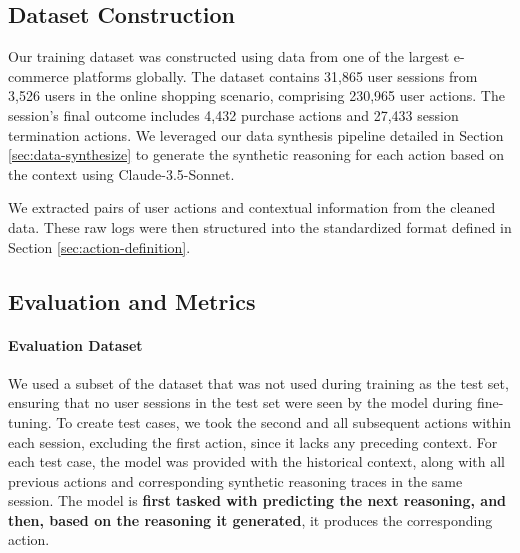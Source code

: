 \documentclass[11pt]{article}
\newcommand{\jing}[1]{\textcolor{purple}{{[Jing: #1]}}}
\begin{document}
\subsection{Dataset Construction}

Our training dataset was constructed using data from one of the largest e-commerce platforms globally.
The dataset contains 31,865 user sessions from 3,526 users in the online shopping scenario, comprising  230,965 user actions.
The session's final outcome includes 4,432 purchase actions and 27,433 session termination actions.
We leveraged our data synthesis pipeline detailed in Section \ref{sec:data-synthesize} to generate the synthetic reasoning for each action based on the context
using Claude-3.5-Sonnet.


We extracted pairs of user actions and contextual information from the cleaned data. These raw logs were then structured into the standardized format defined in Section \ref{sec:action-definition}.

\subsection{Evaluation and Metrics}

\paragraph{Evaluation Dataset}  

We used a subset of the dataset that was not used during training as the test set, ensuring that no user sessions in the test set were seen by the model during fine-tuning.
To create test cases, we took the second and all subsequent actions within each session, excluding the first action, since it lacks any preceding context.
For each test case, the model was provided with the historical context, along with all previous actions and corresponding synthetic reasoning traces in the same session.
The model is \textbf{first tasked with predicting the next reasoning, and then, based on the reasoning it generated}, it produces the corresponding action.
\end{document}
